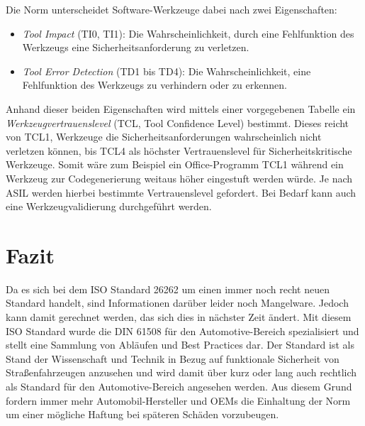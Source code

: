 \documentclass[a4paper,DIV=calc,ngerman]{scrartcl}
\begin{document}
Die Norm unterscheidet Software-Werkzeuge dabei nach zwei Eigenschaften:
\begin{itemize}
    \item \emph{Tool Impact} (TI0, TI1): Die Wahrscheinlichkeit, durch eine Fehlfunktion des Werkzeugs eine Sicherheitsanforderung zu verletzen.
    \item \emph{Tool Error Detection} (TD1 bis TD4): Die Wahrscheinlichkeit, eine Fehlfunktion des Werkzeugs zu verhindern oder zu erkennen.
\end{itemize}
Anhand dieser beiden Eigenschaften wird mittels einer vorgegebenen Tabelle ein \emph{Werkzeugvertrauenslevel} (TCL, Tool Confidence Level) bestimmt. Dieses reicht von TCL1, Werkzeuge die Sicherheitsanforderungen wahrscheinlich nicht verletzen können, bis TCL4 als höchster Vertrauenslevel für Sicherheitskritische Werkzeuge. Somit wäre zum Beispiel ein Office-Programm TCL1 während ein Werkzeug zur Codegenerierung weitaus höher eingestuft werden würde. Je nach ASIL werden hierbei bestimmte Vertrauenslevel gefordert. Bei Bedarf kann auch eine Werkzeugvalidierung durchgeführt werden.





\section{Fazit}
\label{sec:Fazit}
Da es sich bei dem ISO Standard 26262 um einen immer noch recht neuen Standard handelt, sind Informationen darüber leider noch Mangelware. Jedoch kann damit gerechnet werden, das sich dies in nächster Zeit ändert. Mit diesem ISO Standard wurde die DIN 61508 für den Automotive-Bereich spezialisiert und stellt eine Sammlung von Abläufen und Best Practices dar. Der Standard ist als Stand der Wissenschaft und Technik in Bezug auf funktionale Sicherheit von Straßenfahrzeugen anzusehen und wird damit über kurz oder lang auch rechtlich als Standard für den Automotive-Bereich angesehen werden. Aus diesem Grund fordern immer mehr Automobil-Hersteller und OEMs die Einhaltung der Norm um einer mögliche Haftung bei späteren Schäden vorzubeugen.
\end{document}
